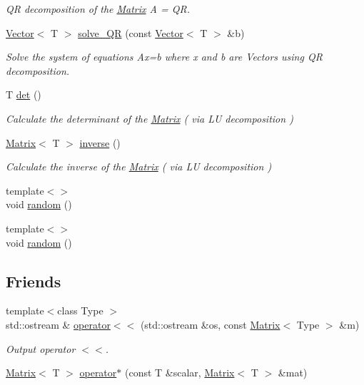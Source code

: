 \begin{DoxyCompactItemize}
\begin{DoxyCompactList}\small\item\em QR decomposition of the \hyperlink{classLuna_1_1Matrix}{Matrix} A = QR. \end{DoxyCompactList}\item 
\hyperlink{classLuna_1_1Vector}{Vector}$<$ T $>$ \hyperlink{classLuna_1_1Matrix_ac3c2472b984be8ef9da41b79b0f2c144}{solve\+\_\+\+QR} (const \hyperlink{classLuna_1_1Vector}{Vector}$<$ T $>$ \&b)
\begin{DoxyCompactList}\small\item\em Solve the system of equations Ax=b where x and b are Vectors using QR decomposition. \end{DoxyCompactList}\item 
T \hyperlink{classLuna_1_1Matrix_ab1325b95f71885bfaabeeeb875bef542}{det} ()
\begin{DoxyCompactList}\small\item\em Calculate the determinant of the \hyperlink{classLuna_1_1Matrix}{Matrix} ( via LU decomposition ) \end{DoxyCompactList}\item 
\hyperlink{classLuna_1_1Matrix}{Matrix}$<$ T $>$ \hyperlink{classLuna_1_1Matrix_a3962ed8b7e17a10ecbcaed0e0320a992}{inverse} ()
\begin{DoxyCompactList}\small\item\em Calculate the inverse of the \hyperlink{classLuna_1_1Matrix}{Matrix} ( via LU decomposition ) \end{DoxyCompactList}\item 
{\footnotesize template$<$$>$ }\\void \hyperlink{classLuna_1_1Matrix_ad99fee600adccac9975b0a1d46fa6ca1}{random} ()
\item 
{\footnotesize template$<$$>$ }\\void \hyperlink{classLuna_1_1Matrix_a8f86d10be1cd07f6a61f9ef7a35e0a35}{random} ()
\end{DoxyCompactItemize}
\subsection*{Friends}
\begin{DoxyCompactItemize}
\item 
{\footnotesize template$<$class Type $>$ }\\std\+::ostream \& \hyperlink{classLuna_1_1Matrix_a8a1fa54fea16289853aa9b484116c68f}{operator$<$$<$} (std\+::ostream \&os, const \hyperlink{classLuna_1_1Matrix}{Matrix}$<$ Type $>$ \&m)
\begin{DoxyCompactList}\small\item\em Output operator $<$$<$. \end{DoxyCompactList}\item 
\hyperlink{classLuna_1_1Matrix}{Matrix}$<$ T $>$ \hyperlink{classLuna_1_1Matrix_a805a2d09b76344fd53ea5517f69711da}{operator$\ast$} (const T \&scalar, \hyperlink{classLuna_1_1Matrix}{Matrix}$<$ T $>$ \&mat)
\end{DoxyCompactItemize}


